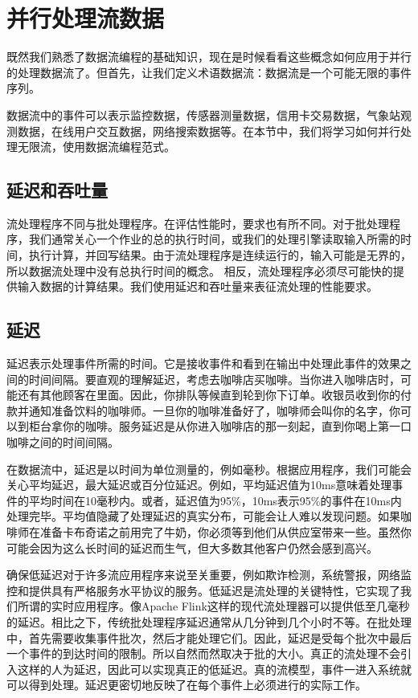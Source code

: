 \documentclass[cn,11pt,chinese]{elegantbook}
\begin{document}
\section{并行处理流数据}

既然我们熟悉了数据流编程的基础知识，现在是时候看看这些概念如何应用于并行的处理数据流了。但首先，让我们定义术语数据流：数据流是一个可能无限的事件序列。

数据流中的事件可以表示监控数据，传感器测量数据，信用卡交易数据，气象站观测数据，在线用户交互数据，网络搜索数据等。在本节中，我们将学习如何并行处理无限流，使用数据流编程范式。

\subsection{延迟和吞吐量}

流处理程序不同与批处理程序。在评估性能时，要求也有所不同。对于批处理程序，我们通常关心一个作业的总的执行时间，或我们的处理引擎读取输入所需的时间，执行计算，并回写结果。由于流处理程序是连续运行的，输入可能是无界的，所以数据流处理中没有总执行时间的概念。 相反，流处理程序必须尽可能快的提供输入数据的计算结果。我们使用延迟和吞吐量来表征流处理的性能要求。

\subsection{延迟}

延迟表示处理事件所需的时间。它是接收事件和看到在输出中处理此事件的效果之间的时间间隔。要直观的理解延迟，考虑去咖啡店买咖啡。当你进入咖啡店时，可能还有其他顾客在里面。因此，你排队等候直到轮到你下订单。收银员收到你的付款并通知准备饮料的咖啡师。一旦你的咖啡准备好了，咖啡师会叫你的名字，你可以到柜台拿你的咖啡。服务延迟是从你进入咖啡店的那一刻起，直到你喝上第一口咖啡之间的时间间隔。

在数据流中，延迟是以时间为单位测量的，例如毫秒。根据应用程序，我们可能会关心平均延迟，最大延迟或百分位延迟。例如，平均延迟值为10ms意味着处理事件的平均时间在10毫秒内。或者，延迟值为95\%，10ms表示95\%的事件在10ms内处理完毕。平均值隐藏了处理延迟的真实分布，可能会让人难以发现问题。如果咖啡师在准备卡布奇诺之前用完了牛奶，你必须等到他们从供应室带来一些。虽然你可能会因为这么长时间的延迟而生气，但大多数其他客户仍然会感到高兴。

确保低延迟对于许多流应用程序来说至关重要，例如欺诈检测，系统警报，网络监控和提供具有严格服务水平协议的服务。低延迟是流处理的关键特性，它实现了我们所谓的实时应用程序。像Apache Flink这样的现代流处理器可以提供低至几毫秒的延迟。相比之下，传统批处理程序延迟通常从几分钟到几个小时不等。在批处理中，首先需要收集事件批次，然后才能处理它们。因此，延迟是受每个批次中最后一个事件的到达时间的限制。所以自然而然取决于批的大小。真正的流处理不会引入这样的人为延迟，因此可以实现真正的低延迟。真的流模型，事件一进入系统就可以得到处理。延迟更密切地反映了在每个事件上必须进行的实际工作。
\end{document}
